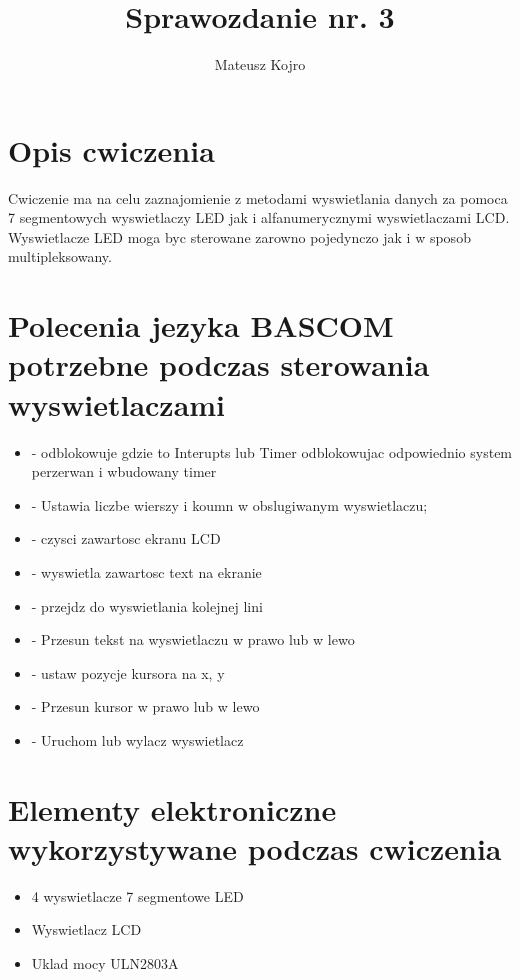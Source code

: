 \documentclass{article}
\title{Sprawozdanie nr. 3}
\author{Mateusz Kojro}
\date{}
\begin{document}
\maketitle

  \section{Opis cwiczenia}
  Cwiczenie ma na celu zaznajomienie z metodami wyswietlania danych za pomoca 7 segmentowych wyswietlaczy LED
  jak i alfanumerycznymi wyswietlaczami LCD.
  Wyswietlacze LED moga byc sterowane zarowno pojedynczo jak i w sposob multipleksowany.

  \section{Polecenia jezyka BASCOM potrzebne podczas sterowania wyswietlaczami}
    \begin{itemize}
      \item {} - odblokowuje  gdzie  to Interupts lub Timer
        odblokowujac odpowiednio system perzerwan i wbudowany timer
      \item {} - Ustawia liczbe wierszy i koumn w obslugiwanym wyswietlaczu;
      \item {} - czysci zawartosc ekranu LCD
      \item {} - wyswietla zawartosc text na ekranie
      \item {} - przejdz do wyswietlania kolejnej lini
      \item {} - Przesun tekst na wyswietlaczu w prawo lub w lewo
      \item {} - ustaw pozycje kursora na x, y
      \item {} - Przesun kursor w prawo lub w lewo
      \item {} - Uruchom lub wylacz wyswietlacz
    \end{itemize}
  \section{Elementy elektroniczne wykorzystywane podczas cwiczenia}

  \begin{itemize}
    \item 4 wyswietlacze 7 segmentowe LED
    \item Wyswietlacz LCD
    \item Uklad mocy ULN2803A
  \end{itemize}
\end{document}
